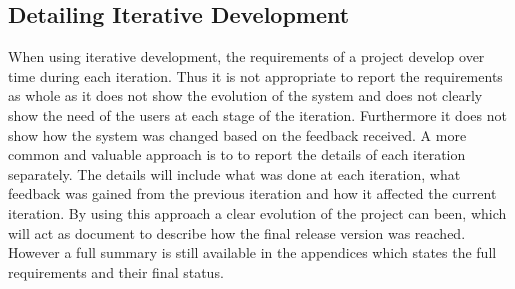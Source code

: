 \documentclass[a4paper,oneside,11pt]{report}
\begin{document}
\subsection{Detailing Iterative Development}
When using iterative development, the requirements of a project develop over time during each iteration. Thus it is not appropriate to report the requirements as whole as it does not show the evolution of the system and does not clearly show the need of the users at each stage of the iteration. Furthermore it does not show how the system was changed based on the feedback received. A more common and valuable approach is to to report the details of each iteration separately. The details will include what was done at each iteration, what feedback was gained from the previous iteration and how it affected the current iteration. By using this approach a clear evolution of the project can been, which will act as document to describe how the final release version was reached. However a full summary is still available in the appendices which states the full requirements and their final status.
 
\end{document}

